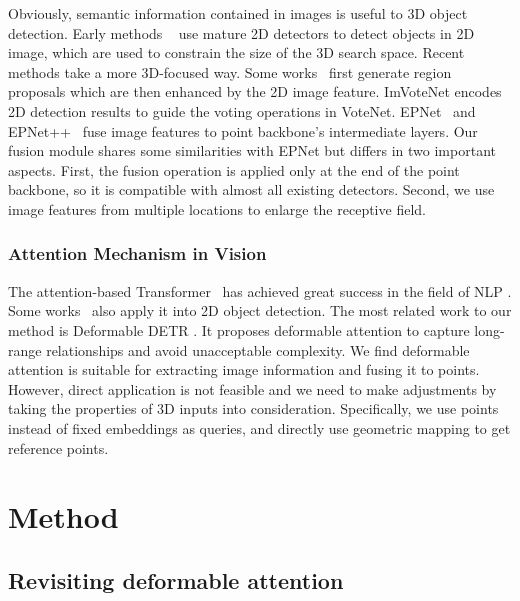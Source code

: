 \documentclass[runningheads]{llncs}
\begin{document}
Obviously, semantic information contained in images is useful to 3D object detection. Early methods ~\cite{Lahoud_2017_ICCV,xu2018pointfusion,qi2018frustum,deng2017amodal} use mature 2D detectors to detect objects in 2D image, which are used to constrain the size of the 3D search space. Recent methods take a more 3D-focused way. Some works~\cite{ku2018joint,hou20193d,liang2018deep} first generate region proposals which are then enhanced by the 2D image feature. ImVoteNet \cite{qi2020imvotenet} encodes 2D detection results to guide the voting operations in VoteNet. EPNet~\cite{10.1007/978-3-030-58555-6_3} and EPNet++~\cite{liu2022epnet} fuse image features to point backbone's intermediate layers. Our fusion module shares some similarities with EPNet but differs in two
important aspects. First, the fusion operation is applied only at the end of the point backbone, so it is compatible with almost all existing detectors. Second, we use image features from multiple locations to enlarge the receptive field.

\subsubsection{Attention Mechanism in Vision}

The attention-based Transformer~\cite{vaswani2017attention} has achieved great success in the field of NLP \cite{devlin2018bert,radford2018improving}. Some works~\cite{zhu2020deformable,carion2020end,hu2018relation} also apply it into 2D object
detection. The most related work to our method is Deformable DETR \cite{zhu2020deformable}. It proposes deformable attention to capture long-range relationships and avoid unacceptable complexity. We find deformable attention is suitable for extracting image information and fusing it to points. However, direct application is not feasible and we need to make adjustments by taking the properties of 3D inputs into consideration. Specifically, we use points instead of fixed embeddings as queries, and directly use geometric mapping to get reference points. 

\section{Method}

\subsection{Revisiting deformable attention}
\end{document}
